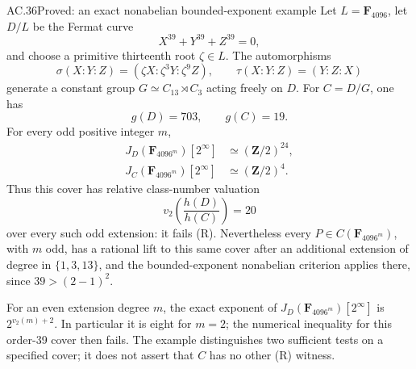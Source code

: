 \begin{claim}{AC.36}{Proved: an exact nonabelian bounded-exponent example}
Let \(L=\mathbf F_{4096}\), let \(D/L\) be the Fermat curve
\[
                         X^{39}+Y^{39}+Z^{39}=0,
\]
and choose a primitive thirteenth root \(\zeta\in L\).
The automorphisms
\[
 \sigma(X:Y:Z)=(\zeta X:\zeta^3Y:\zeta^9Z),
 \qquad \tau(X:Y:Z)=(Y:Z:X)
\]
generate a constant group \(G\simeq C_{13}\rtimes C_3\)
acting freely on \(D\). For \(C=D/G\), one has
\[
                  g(D)=703,\qquad g(C)=19.
\]
For every odd positive integer \(m\),
\[
 \begin{aligned}
 J_D(\mathbf F_{4096^m})[2^\infty]
                  &\simeq(\mathbf Z/2)^{24},\\
 J_C(\mathbf F_{4096^m})[2^\infty]
                  &\simeq(\mathbf Z/2)^4.
 \end{aligned}
\]
Thus this cover has relative class-number valuation
\[
             v_2\!\left(\frac{h(D)}{h(C)}\right)=20
\]
over every such odd extension: it fails (R).
Nevertheless every \(P\in C(\mathbf F_{4096^m})\), with
\(m\) odd, has a rational lift to this same cover after
an additional extension of degree in \(\{1,3,13\}\),
and the bounded-exponent nonabelian criterion applies there,
since \(39>(2-1)^2\).

For an even extension degree \(m\), the exact exponent of
\(J_D(\mathbf F_{4096^m})[2^\infty]\) is
\(2^{v_2(m)+2}\). In particular it is eight for \(m=2\);
the numerical inequality for this order-39 cover then fails.
The example distinguishes two sufficient tests on a specified
cover; it does not assert that \(C\) has no other (R) witness.
\end{claim}
